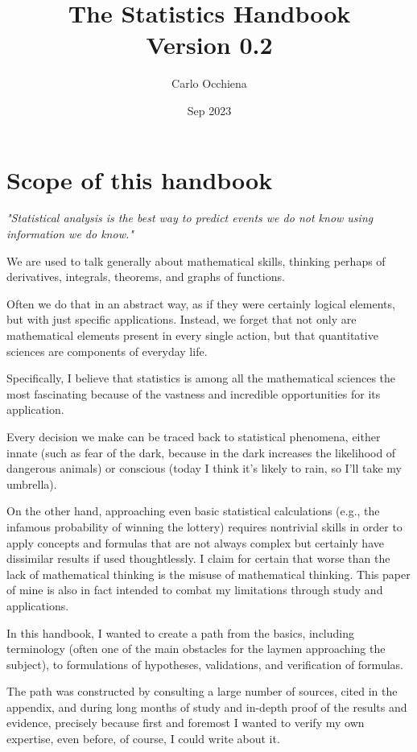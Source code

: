 \documentclass{article}
\title{The Statistics Handbook \\ 
    \normalsize Version 0.2}
\author{ Carlo Occhiena }
\date{ Sep 2023 }
\begin{document}
\fancyhead{}
\setlength{\headheight}{13.6pt}
\pagestyle{fancy}
\rhead[]{\rightmark} %

\maketitle
\tableofcontents
\clearpage

\section{Scope of this handbook}
\emph{"Statistical analysis is the best way to predict events we do not know using information we do know."} 


We are used to talk generally about mathematical skills, thinking perhaps of derivatives, integrals, theorems, and graphs of functions. 

Often we do that in an abstract way, as if they were certainly logical elements, but with just specific applications. Instead, we forget that not only are mathematical elements present in every single action, but that quantitative sciences are components of everyday life.

Specifically, I believe that statistics is among all the mathematical sciences the most fascinating because of the vastness and incredible opportunities for its application. 

Every decision we make can be traced back to statistical phenomena, either innate (such as fear of the dark, because in the dark increases the likelihood of dangerous animals) or conscious (today I think it's likely to rain, so I'll take my umbrella). 

On the other hand, approaching even basic statistical calculations (e.g., the infamous probability of winning the lottery) requires nontrivial skills in order to apply concepts and formulas that are not always complex but certainly have dissimilar results if used thoughtlessly. I claim for certain that worse than the lack of mathematical thinking is the misuse of mathematical thinking. This paper of mine is also in fact intended to combat my limitations through study and applications. 

In this handbook, I wanted to create a path from the basics, including terminology (often one of the main obstacles for the laymen approaching the subject), to formulations of hypotheses, validations, and verification of formulas.

The path was constructed by consulting a large number of sources, cited in the appendix, and during long months of study and in-depth proof of the results and evidence, precisely because first and foremost I wanted to verify my own expertise, even before, of course, I could write about it. 
\end{document}
